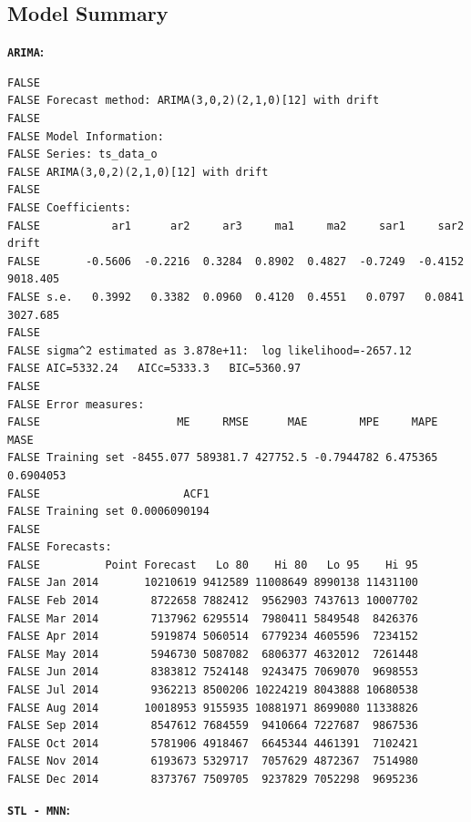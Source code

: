 \documentclass[openany]{book}
\begin{document}
\hypertarget{Part-B-summary}{%
\subsection*{Model Summary}\label{Part-B-summary}}

\textbf{\texttt{ARIMA}:}

\begin{verbatim}
FALSE 
FALSE Forecast method: ARIMA(3,0,2)(2,1,0)[12] with drift
FALSE 
FALSE Model Information:
FALSE Series: ts_data_o 
FALSE ARIMA(3,0,2)(2,1,0)[12] with drift 
FALSE 
FALSE Coefficients:
FALSE           ar1      ar2     ar3     ma1     ma2     sar1     sar2     drift
FALSE       -0.5606  -0.2216  0.3284  0.8902  0.4827  -0.7249  -0.4152  9018.405
FALSE s.e.   0.3992   0.3382  0.0960  0.4120  0.4551   0.0797   0.0841  3027.685
FALSE 
FALSE sigma^2 estimated as 3.878e+11:  log likelihood=-2657.12
FALSE AIC=5332.24   AICc=5333.3   BIC=5360.97
FALSE 
FALSE Error measures:
FALSE                     ME     RMSE      MAE        MPE     MAPE      MASE
FALSE Training set -8455.077 589381.7 427752.5 -0.7944782 6.475365 0.6904053
FALSE                      ACF1
FALSE Training set 0.0006090194
FALSE 
FALSE Forecasts:
FALSE          Point Forecast   Lo 80    Hi 80   Lo 95    Hi 95
FALSE Jan 2014       10210619 9412589 11008649 8990138 11431100
FALSE Feb 2014        8722658 7882412  9562903 7437613 10007702
FALSE Mar 2014        7137962 6295514  7980411 5849548  8426376
FALSE Apr 2014        5919874 5060514  6779234 4605596  7234152
FALSE May 2014        5946730 5087082  6806377 4632012  7261448
FALSE Jun 2014        8383812 7524148  9243475 7069070  9698553
FALSE Jul 2014        9362213 8500206 10224219 8043888 10680538
FALSE Aug 2014       10018953 9155935 10881971 8699080 11338826
FALSE Sep 2014        8547612 7684559  9410664 7227687  9867536
FALSE Oct 2014        5781906 4918467  6645344 4461391  7102421
FALSE Nov 2014        6193673 5329717  7057629 4872367  7514980
FALSE Dec 2014        8373767 7509705  9237829 7052298  9695236
\end{verbatim}

\textbf{\texttt{STL\ -\ MNN}:}
\end{document}
